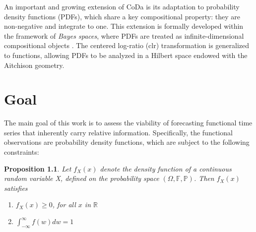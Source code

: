 \documentclass[
	12pt,				%
	oneside,			%
	a4paper,			%
	english,			%
	brazil				%
	]{abntex2ppgsi}
\newtheorem{proposition}{Proposition}
\begin{document}
An important and growing extension of CoDa is its adaptation to probability density functions (PDFs), which share a key compositional property: they are non-negative and integrate to one. This extension is formally developed within the framework of \textit{Bayes spaces}, where PDFs are treated as infinite-dimensional compositional objects \cite{egozcue2006hilbert}. The centered log-ratio (clr) transformation is generalized to functions, allowing PDFs to be analyzed in a Hilbert space endowed with the Aitchison geometry. 







\chapter{Goal}
The main goal of this work is to assess the viability of forecasting functional time series that inherently carry relative information. Specifically, the functional observations are probability density functions, which are subject to the following constraints:
\begin{proposition}
Let $f_X(x)$ denote the density function of a continuous random variable X,  defined on the probability space $(\Omega, \mathbb{F}, \mathbb{P})$. Then $f_X(x)$ satisfies
\begin{enumerate}
    \item $f_X(x)\geq0$, for all $x$ in $\mathbb{R}$
    \item $\int_{-\infty}^{\infty}f(w)dw=1$
\end{enumerate}
    
\end{proposition}
\end{document}
